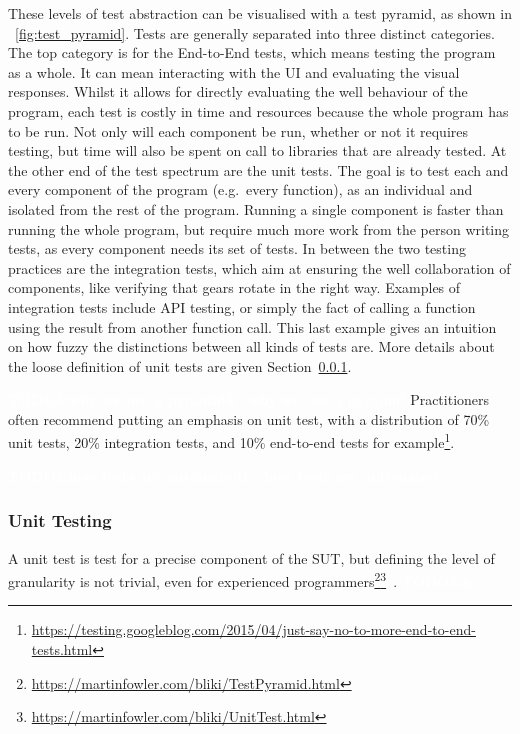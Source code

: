 \documentclass[11pt]{sdm_internship}
\newcommand{\todo}[1]{\colorbox{Red!75}{\textcolor{white}{\textbf{TODO\ifx&#1&\else: #1\fi}}}}
\theoremstyle{definition}
\begin{document}
These levels of test abstraction can be visualised with a test pyramid, as shown in \figurename~\ref{fig:test_pyramid}.
Tests are generally separated into three distinct categories.
The top category is for the End-to-End tests, which means testing the program as a whole.
It can mean interacting with the UI and evaluating the visual responses.
Whilst it allows for directly evaluating the well behaviour of the program, each test is costly in time and resources because the whole program has to be run.
Not only will each component be run, whether or not it requires testing, but time will also be spent on call to libraries that are already tested.
At the other end of the test spectrum are the unit tests.
The goal is to test each and every component of the program (e.g.\ every function), as an individual and isolated from the rest of the program.
Running a single component is faster than running the whole program, but require much more work from the person writing tests, as every component needs its set of tests.
In between the two testing practices are the integration tests, which aim at ensuring the well collaboration of components, like verifying that gears rotate in the right way.
Examples of integration tests include API testing, or simply the fact of calling a function using the result from another function call.
This last example gives an intuition on how fuzzy the distinctions between all kinds of tests are.
More details about the loose definition of unit tests are given Section~\ref{sssec:unit_testing}.

\todo{why we use a pyramid}
Practitioners often recommend putting an emphasis on unit test, with a distribution of 70\% unit tests, 20\% integration tests, and 10\% end-to-end tests for example\footnote{\url{https://testing.googleblog.com/2015/04/just-say-no-to-more-end-to-end-tests.html}}.

\todo{how tests are automated}

\subsubsection{Unit Testing}%
\label{sssec:unit_testing}

A unit test is test for a precise component of the SUT, but defining the level of granularity is not trivial, even for experienced programmers\footnote{\url{https://martinfowler.com/bliki/TestPyramid.html}}\footnote{\url{https://martinfowler.com/bliki/UnitTest.html}}~\cite{runeson2006survey}.
\todo{}
\end{document}
